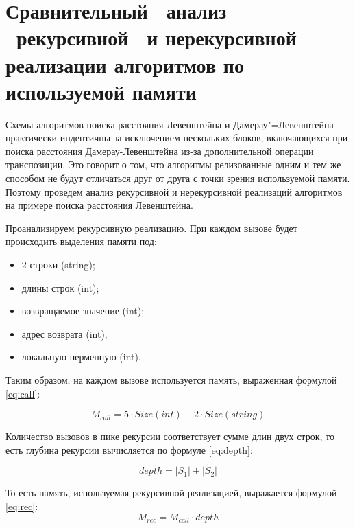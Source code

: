 \clearpage

\section[\nohyphens{Сравнительный ~анализ ~рекурсивной ~и нерекурсивной реализации
         алгоритмов по используемой памяти}]
         {Сравнительный ~анализ ~рекурсивной ~и нерекурсивной реализации
         алгоритмов по используемой памяти}

Схемы алгоритмов поиска расстояния Левенштейна и Дамерау"=Левенштейна
практически индентичны за исключением нескольких блоков, включающихся при
поиска расстояния Дамерау-Левенштейна из-за дополнительной операции
транспозиции. Это говорит о том, что алгоритмы релизованные одним и тем же
способом не будут отличаться друг от друга с точки зрения используемой памяти.
Поэтому проведем анализ рекурсивной и нерекурсивной реализаций алгоритмов на
примере поиска расстояния Левенштейна.

Проанализируем рекурсивную реализацию. При каждом вызове будет происходить
выделения памяти под:
\begin{itemize}
    \item 2 строки (string);
    \item длины строк (int);
    \item возвращаемое значение (int);
    \item адрес возврата (int);
    \item локальную перменную (int).
\end{itemize}

Таким образом, на каждом вызове используется память, выраженная формулой
\ref{eq:call}:

\begin{equation}\label{eq:call}
    M_{call} = 5 \cdot Size(int) + 2 \cdot Size(string)
\end{equation}

Количество вызовов в пике рекурсии соответствует сумме длин двух строк, то есть
глубина рекурсии вычисляется по формуле \ref{eq:depth}:

\begin{equation}\label{eq:depth}
    depth = |S_1| + |S_2|
\end{equation}

То есть память, используемая рекурсивной реализацией, выражается формулой
\ref{eq:rec}:
\begin{equation}\label{eq:rec}
    M_{rec} = M_{call} \cdot depth
\end{equation}

